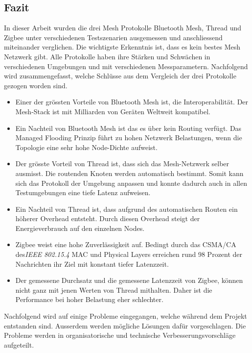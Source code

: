 \newpage
\subsection{Fazit}\label{subsec:Fazit}
In dieser Arbeit wurden die drei Mesh Protokolle Bluetooth Mesh, Thread und Zigbee unter verschiedenen Testszenarien ausgemessen und anschliessend miteinander verglichen.
Die wichtigste Erkenntnis ist, dass es kein bestes Mesh Netzwerk gibt.
Alle Protokolle haben ihre Stärken und Schwächen in verschiedenen Umgebungen und mit verschiedenen Messparametern.
Nachfolgend wird zusammengefasst, welche Schlüsse aus dem Vergleich der drei Protokolle gezogen worden sind.

\begin{itemize}

	\item Einer der grössten Vorteile von Bluetooth Mesh ist, die Interoperabilität. Der Mesh-Stack ist mit Milliarden von Geräten Weltweit kompatibel. 
	\item Ein Nachteil von Bluetooth Mesh ist das es über kein Routing verfügt. Das Managed Flooding Prinzip führt zu hohen Netzwerk Belastungen, wenn die Topologie eine sehr hohe Node-Dichte aufweist.
	\item Der grösste Vorteil von Thread ist, dass sich das Mesh-Netzwerk selber ausmisst. Die routenden Knoten werden automatisch bestimmt. Somit kann sich das Protokoll der Umgebung anpassen und konnte dadurch auch in allen Testumgebungen eine tiefe Latenz aufweisen.
	\item Ein Nachteil von Thread ist, dass aufgrund des automatischen Routen ein höherer Overhead entsteht. Durch diesen Overhead steigt der Energieverbrauch auf den einzelnen Nodes.
	\item Zigbee weist eine hohe Zuverlässigkeit auf.
	Bedingt durch das CSMA\slash CA des\linebreak \textit{IEEE 802.15.4} MAC und Physical Layers erreichen rund 98 Prozent der Nachrichten ihr Ziel mit konstant tiefer Latenzzeit.
	\item Der gemessene Durchsatz und die gemessene Latenzzeit von Zigbee, können nicht ganz mit jenen Werten von Thread mithalten.
	Daher ist die Performance bei hoher Belastung eher schlechter.
\end{itemize}

Nachfolgend wird auf einige Probleme eingegangen, welche während dem Projekt entstanden sind. Ausserdem werden mögliche Lösungen dafür vorgeschlagen.
Die Probleme werden in organisatorische und technische Verbesserungsvorschläge aufgeteilt.

